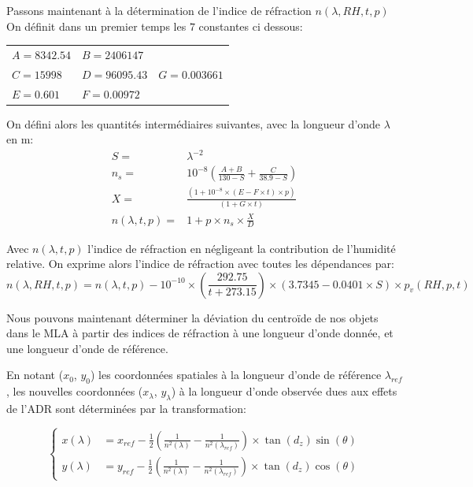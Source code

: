 \documentclass[../main/main.tex]{subfiles}
\begin{document}
Passons maintenant à la détermination de l'indice de réfraction $n(\lambda,RH,t,p)$
On définit dans un premier temps les $7$ constantes ci dessous:

\begin{center}
  \renewcommand{\arraystretch}{1.5}
\begin{tabular}{lll}
$A= 8342.54$ & $B = 2406147$ &\\
$C= 15998$ & $D = 96095.43$& $G = 0.003661$\\
$E = 0.601 $& $F = 0.00972$ &  \\
\end{tabular}
\end{center}

On défini alors les quantités intermédiaires suivantes, avec la longueur
d'onde $\lambda$ en \textmu m:
\begin{align*}
    S =&  \lambda^{-2}\\
    n_s =& 10^{-8}\left(\frac{A + B}{130 - S} + \frac{C}{38.9 - S}\right)\\
    X =& \frac{\left(1 + 10^{-8} \times (E - F\times t) \times
         p\right)}{(1 + G \times t)}\\
    n(\lambda,t,p) =& 1 + p \times n_s \times \frac{X}{D}
\end{align*}

Avec $n(\lambda,t,p)$ l'indice de réfraction en négligeant la contribution de
l'humidité relative. On exprime alors l'indice de réfraction avec toutes
les dépendances par:
\begin{equation}
  \label{eq:refractindex}
    n(\lambda,RH,t,p) = n(\lambda,t,p) - 10^{-10}\times \left(\frac{292.75}{t + 273.15}\right) \times \left(3.7345 - 0.0401 \times S\right)\times p_v(RH,p,t)
\end{equation}

Nous pouvons maintenant déterminer la déviation du centroïde de nos
objets dans le MLA à partir des indices de réfraction à une longueur
d'onde donnée, et une longueur d'onde de référence.

En notant ($x_{0}$, $y_{0}$) les coordonnées spatiales à la longueur
d'onde de référence $\lambda_{ref}$, les nouvelles coordonnées ($x_{\lambda}$, $y_{\lambda}$) à
la longueur d'onde observée dues aux effets de l'ADR sont déterminées
par la transformation:

$$
  \left\{
    \begin{array}{ll}
    x(\lambda)&= x_{ref} - \frac{1}{2}\left( \frac{1}{n^{2}(\lambda)} - \frac{1}{n^{2}(\lambda_{ref})}\right)\times \tan(d_{z})\sin(\theta) \\
    y(\lambda)&= y_{ref} - \frac{1}{2}\left( \frac{1}{n^{2}(\lambda)} - \frac{1}{n^{2}(\lambda_{ref})}\right)\times \tan(d_{z})\cos(\theta)
    \end{array}
   \right.
$$
\end{document}

